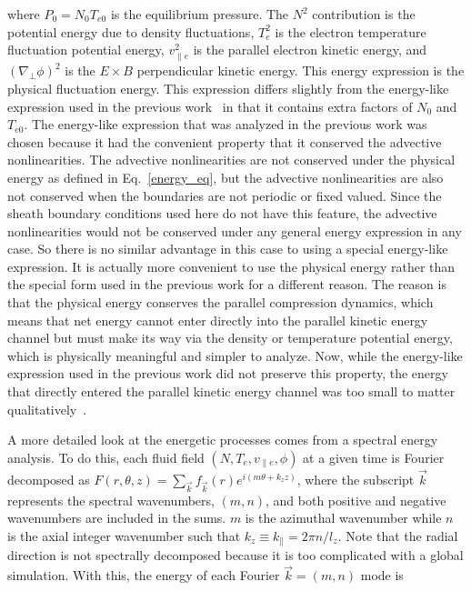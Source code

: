 \documentclass[showpacs,preprintnumbers,amsmath,amssymb,superscriptaddress,aip]{revtex4-1}
\def\para{\parallel}
\def\grad{\nabla}
\newcommand{\gradperp}{\grad_\perp}
\newcommand{\vpe}{v_{\parallel e}}
\begin{document}
where $P_0 = N_0 T_{e0}$ is the equilibrium pressure.
The $N^2$ contribution is the potential energy due to density fluctuations, $T_e^2$ is the electron temperature fluctuation potential energy,
$\vpe^2$ is the parallel electron kinetic energy, and $(\gradperp \phi)^2$ is the $E \times B$ perpendicular kinetic energy.
This energy expression is the physical fluctuation energy. This expression differs slightly from the energy-like expression used in the previous work~\cite{friedman2012b} in that it contains
extra factors of $N_0$ and $T_{e0}$. The energy-like expression that was analyzed in the previous work was chosen because it had the convenient property that it conserved the advective nonlinearities.
The advective nonlinearities are not conserved under the physical energy as defined in Eq.~\ref{energy_eq}, but the advective nonlinearities are also not conserved when the boundaries are not
periodic or fixed valued. Since the sheath boundary conditions used here do not have this feature, the advective nonlinearities would not be conserved under any general energy expression in any case.
So there is no similar advantage in this case to using a special energy-like expression. It is actually more convenient to use the physical energy rather than the special form used in the 
previous work for a different reason. 
The reason is that the physical energy conserves the parallel compression dynamics, which means that net energy cannot enter directly into
the parallel kinetic energy channel but must make its way via the density or temperature potential energy, which is physically meaningful and simpler to analyze. 
Now, while the energy-like expression used in the previous work did not preserve this property, the energy that directly entered the parallel kinetic energy channel was too small to matter 
qualitatively~\cite{friedman2012b}.

A more detailed look at the energetic processes comes from a spectral energy analysis. To do this, each fluid field $(N,T_e,\vpe,\phi)$ at a given time is Fourier decomposed as 
$F(r,\theta,z) = \sum_{\vec{k}} f_{\vec{k}}(r) e^{i (m \theta + k_z z )}$,
where the subscript $\vec{k}$ represents the spectral wavenumbers, $(m,n)$, and both positive and negative wavenumbers are included in the sums. 
$m$ is the azimuthal wavenumber while $n$ is the axial integer wavenumber such that $k_z \equiv k_\para = 2 \pi n/l_z$. 
Note that the radial direction is not spectrally decomposed because it is too complicated with a global simulation.
With this, the energy of each Fourier $\vec{k} = (m,n)$ mode is
\end{document}
